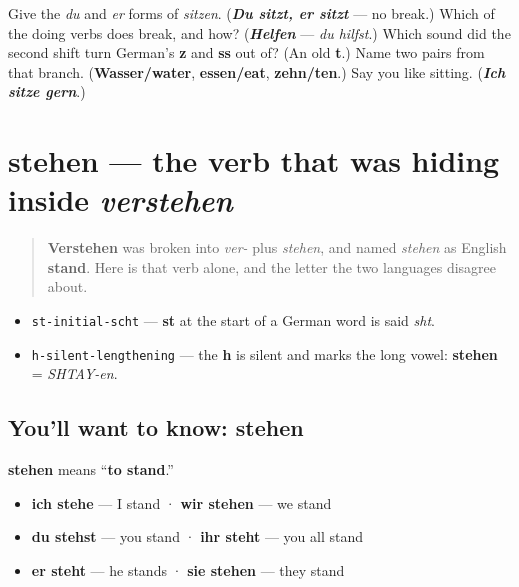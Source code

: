 \begin{tcolorbox}[breakable,colback=teal!4,colframe=teal!35!black,title={Before you move on}]
Give the \emph{du} and \emph{er} forms of \emph{sitzen}. (\emph{\textbf{Du sitzt, er sitzt}} — no break.) Which of the doing verbs does break, and how? (\emph{\textbf{Helfen}} — \emph{du hilfst}.) Which sound did the second shift turn German's \textbf{z} and \textbf{ss} out of? (An old \textbf{t}.) Name two pairs from that branch. (\textbf{Wasser/water}, \textbf{essen/eat}, \textbf{zehn/ten}.) Say you like sitting. (\emph{\textbf{Ich sitze gern}}.)
\end{tcolorbox}
\section[stehen]{stehen — the verb that was hiding inside \emph{verstehen}}

\label{lesson:GE-C26-stehen}



\begin{quote}
\textbf{Verstehen} was broken into \emph{ver-} plus \emph{stehen}, and named \emph{stehen} as English \textbf{stand}. Here is that verb alone, and the letter the two languages disagree about.
\end{quote}

\begin{sounds}
\begin{itemize}
\raggedright
  \item \texttt{st-initial-scht} — \textbf{st} at the start of a German word is said \emph{sht}.
  \item \texttt{h-silent-lengthening} — the \textbf{h} is silent and marks the long vowel: \textbf{stehen} = \emph{SHTAY-en}.
\end{itemize}
\end{sounds}

\subsection*{You'll want to know: stehen}
\textbf{stehen} means \textquotedblleft{}\textbf{to stand}.\textquotedblright{}

\begin{itemize}
\raggedright
  \item \textbf{ich stehe} — I stand · \textbf{wir stehen} — we stand
  \item \textbf{du stehst} — you stand · \textbf{ihr steht} — you all stand
  \item \textbf{er steht} — he stands · \textbf{sie stehen} — they stand
\end{itemize}

